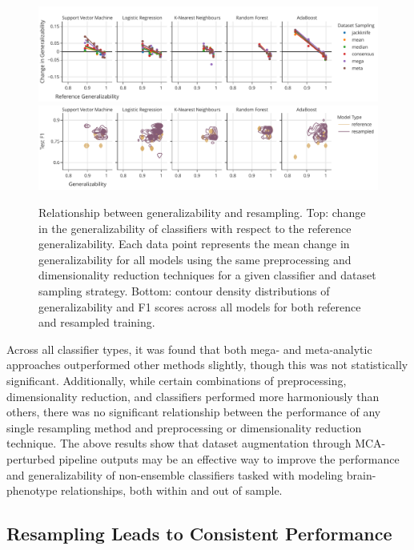 \documentclass[10pt]{SelfArx} %
\begin{document}
\begin{figure}[bht!]\centering
\includegraphics[width=\linewidth]{figures/2a.pdf}
\includegraphics[width=\linewidth]{figures/2b.pdf}
\caption{Relationship between generalizability and resampling. Top: change in the generalizability of classifiers with
respect to the reference generalizability. Each data point represents the mean change in generalizability for all
models using the same preprocessing and dimensionality reduction techniques for a given classifier and dataset sampling
strategy. Bottom: contour density distributions of generalizability and F1 scores across all models for both reference
and resampled training.
}
\label{fig:change_in_gen}
\end{figure}

Across all classifier types, it was found that both mega- and meta-analytic approaches outperformed other methods
slightly, though this was not statistically significant. Additionally, while certain combinations of preprocessing,
dimensionality reduction, and classifiers performed more harmoniously than others, there was no significant
relationship between the performance of any single resampling method and preprocessing or dimensionality reduction
technique. The above results show that dataset augmentation through MCA-perturbed pipeline outputs may be an effective
way to improve the performance and generalizability of non-ensemble classifiers tasked with modeling brain-phenotype
relationships, both within and out of sample.

\subsection*{Resampling Leads to Consistent Performance}
\end{document}
